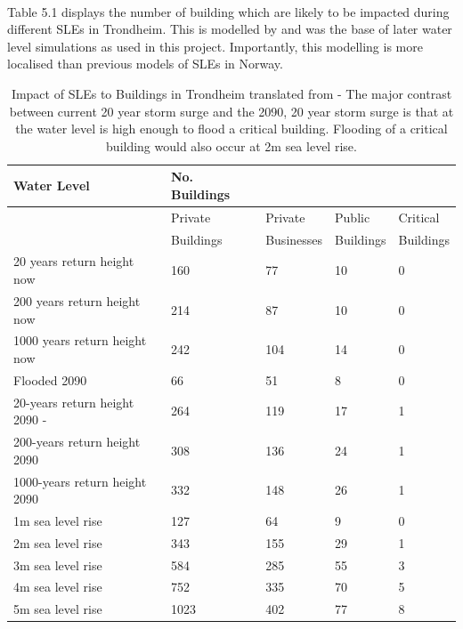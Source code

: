 \paragraph{}
Table 5.1 displays the number of building which are likely to be impacted during different SLEs in Trondheim. This is modelled by \cite{kartverket_se_2021} and was the base of later water level simulations as used in this project. Importantly, this modelling is more localised than previous models of SLEs in Norway.

\begin{table}[H]
    \centering
    \begin{tabular}{|l|l|l|l|l|}
    \hline
        \textbf{Water Level }& \textbf{No. Buildings}  & ~ & ~ & ~ \\ \hline
        ~ & Private & Private & Public  & Critical  \\ \newline
        ~ & Buildings & Businesses & Buildings & Buildings \\ \hline        
        20 years return height now & 160 & 77 & 10 & 0 \\ \hline
        200 years return height now & 214 & 87 & 10 & 0 \\ \hline
        1000 years return height now & 242 & 104 & 14 & 0 \\ \hline
        Flooded 2090 & 66 & 51 & 8 & 0 \\ \hline
        20-years return height 2090 -& 264 & 119 & 17 & 1 \\ \hline
        200-years return height  2090 & 308 & 136 & 24 & 1 \\ \hline
        1000-years return height  2090 & 332 & 148 & 26 & 1 \\ \hline
        1m sea level rise & 127 & 64 & 9 & 0 \\ \hline
        2m sea level rise & 343 & 155 & 29 & 1 \\ \hline
        3m sea level rise & 584 & 285 & 55 & 3 \\ \hline
        4m sea level rise & 752 & 335 & 70 & 5 \\ \hline
        5m sea level rise & 1023 & 402 & 77 & 8 \\ \hline
    \end{tabular}
    \caption{Impact of SLEs to Buildings in Trondheim translated from \cite{kartverket_se_2021} - The major contrast between current 20 year storm surge and the 2090, 20 year storm surge is that at the water level is high enough to flood a critical building. Flooding of a critical building would also occur at 2m sea level rise.}
    \label{building-impact-sle}
\end{table}


